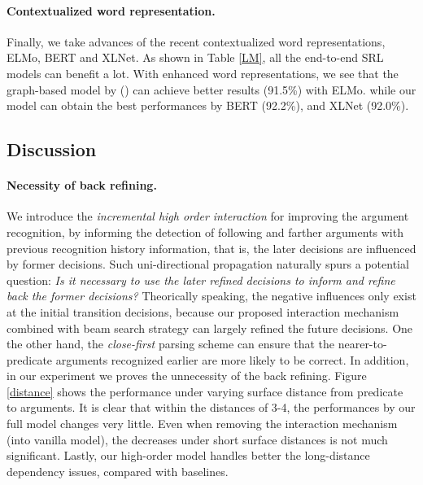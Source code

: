 \documentclass[letterpaper]{article} \usepackage{aaai21}  \usepackage{times}  \usepackage{helvet} \usepackage{courier}  \usepackage[hyphens]{url}  \usepackage{graphicx} \urlstyle{rm} \def\UrlFont{\rm}  \usepackage{natbib}  \usepackage{caption}
\begin{document}
\begin{CJK}{UTF8}{gbsn}
\paragraph{Contextualized word representation.}
Finally, we take advances of the recent contextualized word representations, ELMo, BERT and XLNet.
As shown in Table \ref{LM}, all the end-to-end SRL models can benefit a lot.
With enhanced word representations, we see that the graph-based model by \citeauthor{LiHZZZZZ19} (\citeyear{LiHZZZZZ19}) can achieve better results (91.5\%) with ELMo.
while our model can obtain the best performances by BERT (92.2\%), and XLNet (92.0\%).







\subsection{Discussion}


\paragraph{Necessity of back refining.}


We introduce the \emph{incremental high order interaction} for improving the argument recognition, by informing the detection of following and farther arguments with previous recognition history information, that is, the later decisions are influenced by former decisions.
Such uni-directional propagation naturally spurs a potential question:
\emph{Is it necessary to use the later refined decisions to inform and refine back the former decisions?}
Theorically speaking, the negative influences only exist at the initial transition decisions, because our proposed interaction mechanism combined with beam search strategy can largely refined the future decisions.
One the other hand, the \emph{close-first} parsing scheme can ensure that the nearer-to-predicate arguments recognized earlier are more likely to be correct.
In addition, in our experiment we proves the unnecessity of the back refining.
Figure \ref{distance} shows the performance under varying surface distance from predicate to arguments.
It is clear that within the distances of 3-4, the performances by our full model changes very little.
Even when removing the interaction mechanism (into vanilla model), the decreases under short surface distances is not much significant.
Lastly, our high-order model handles better the long-distance dependency issues, compared with baselines.













\end{CJK}
\end{document}
